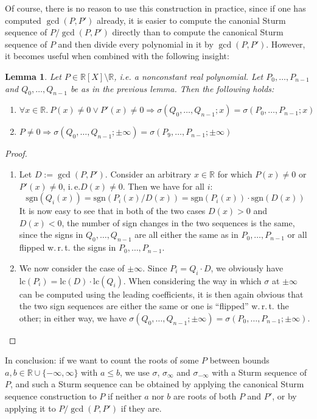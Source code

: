 \documentclass[11pt,a4paper,oneside]{article}
\newtheorem{lemma}[definition]{Lemma}
\newcommand{\RR}{\mathbb{R}}
\newcommand{\ie}{i.\,e.\xspace}
\newcommand{\wrt}{w.\,r.\,t.\xspace}
\begin{document}
Of course, there is no reason to use this construction in practice, since if one has computed $\gcd(P,P')$ already, it is easier to compute the canonial Sturm sequence of $P/\gcd(P,P')$ directly than to compute the canonical Sturm sequence of $P$ and then divide every polynomial in it by $\gcd(P,P')$. However, it becomes useful when combined with the following insight:
\begin{lemma}\label{thm:sturm_multiple_aux2}
Let $P\in\RR[X]\setminus\RR$, i.e. a nonconstant real polynomial. Let $P_0, \ldots, P_{n-1}$ and $Q_0,\ldots, Q_{n-1}$ be as in the previous lemma. Then the following holds:
\begin{enumerate}
\item $\forall x\in\RR.\ P(x)\neq 0\vee P'(x)\neq 0 \Longrightarrow \sigma(Q_0, \ldots, Q_{n-1}; x) = \sigma(P_0, \ldots, P_{n-1}; x)$
\item $P\neq 0 \Longrightarrow \sigma(Q_0,\ldots,Q_{n-1}; \pm\infty) = \sigma(P_9,\ldots,P_{n-1};\pm\infty)$
\end{enumerate}
\end{lemma}
\begin{proof}\ 
\begin{enumerate}
\item Let $D:=\gcd(P,P')$. Consider an arbitrary $x\in\RR$ for which $P(x)\neq 0$ or $P'(x)\neq 0$, \ie $D(x)\neq 0$. Then we have for all $i$:
$$\mathrm{sgn}(Q_i(x)) = \mathrm{sgn}(P_i(x) / D(x)) = \mathrm{sgn}(P_i(x)) \cdot \mathrm{sgn}(D(x))$$
It is now easy to see that in both of the two cases $D(x)>0$ and $D(x)<0$, the number of sign changes in the two sequences is the same, since the signs in $Q_0,\ldots, Q_{n-1}$ are all either the same as in $P_0,\ldots, P_{n-1}$ or all flipped \wrt the signs in $P_0,\ldots,P_{n-1}$.
\item We now consider the case of $\pm\infty$. Since $P_i = Q_i\cdot D$, we obviously have $\mathrm{lc}(P_i) = \mathrm{lc}(D)\cdot \mathrm{lc}(Q_i)$. When considering the way in which $\sigma$ at $\pm\infty$ can be computed using the leading coefficients, it is then again obvious that the two sign sequences are either the same or one is \enquote{flipped} \wrt the other; in either way, we have $\sigma(Q_0,\ldots,Q_{n-1};\pm\infty) = \sigma(P_0,\ldots,P_{n-1};\pm\infty)$.
\end{enumerate}
\end{proof}

In conclusion: if we want to count the roots of some $P$ between bounds $a,b\in\RR\cup\{-\infty,\infty\}$ with $a\leq b$, we use $\sigma$, $\sigma_\infty$ and $\sigma_{-\infty}$ with a Sturm sequence of $P$, and such a Sturm sequence can be obtained by applying the canonical Sturm sequence construction to $P$ if neither $a$ nor $b$ are roots of both $P$ and $P'$, or by applying it to $P/\gcd(P,P')$ if they are.
\end{document}
